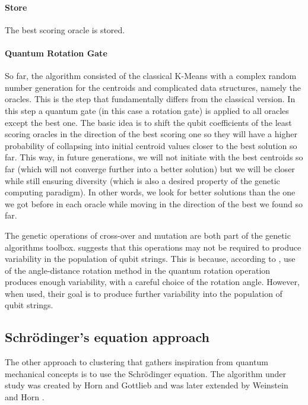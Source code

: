 \paragraph{Store}
The best scoring oracle is stored.

\paragraph{Quantum Rotation Gate}
So far, the algorithm consisted of the classical K-Means with a complex random number generation for the centroids and complicated data structures, namely the oracles.
This is the step that fundamentally differs from the classical version.
In this step a quantum gate (in this case a rotation gate) is applied to all oracles except the best one.
The basic idea is to shift the qubit coefficients of the least scoring oracles in the direction of the best scoring one so they will have a higher probability of collapsing into initial centroid values closer to the best solution so far.
This way, in future generations, we will not initiate with the best centroids so far (which will not converge further into a better solution) but we will be closer while still ensuring diversity (which is also a desired property of the genetic computing paradigm).
In other words, we look for better solutions than the one we got before in each oracle while moving in the direction of the best we found so far.

The genetic operations of cross-over and mutation are both part of the genetic algorithms toolbox. \cite{Wiebe2014} suggests that this operations may not be required to produce variability in the population of qubit strings.
This is because, according to \cite{Liu2010}, use of the angle-distance rotation method in the quantum rotation operation produces enough variability, with a careful choice of the rotation angle.
However, when used, their goal is to produce further variability into the population of qubit strings.

\subsection{Schrödinger's equation approach}%
\label{sec:horn}

The other approach to clustering that gathers inspiration from quantum mechanical concepts is to use the Schrödinger equation.
The algorithm under study was created by Horn and Gottlieb \cite{Horn2010} and was later extended by Weinstein and Horn \cite{Weinstein2009}.

